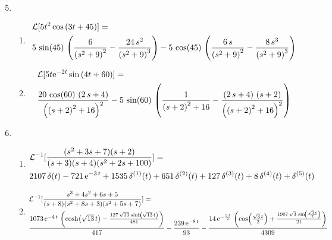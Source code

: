 \documentclass[main.tex]{subfiles}
\begin{document}
\begin{enumerate}
	\setcounter{enumi}{4}
	\item
		\begin{enumerate}
			\item
				\begin{align*}
					  &\mathcal{L}[5t^2\cos{(3t+45)}] =
					\\& 5\, \sin\!\left(45\right)\, \left(\frac{6}{{\left(s^2 + 9\right)}^2} - \frac{24\, s^2}{{\left(s^2 + 9\right)}^3}\right) - 5\, \cos\!\left(45\right)\, \left(\frac{6\, s}{{\left(s^2 + 9\right)}^2} - \frac{8\, s^3}{{\left(s^2 + 9\right)}^3}\right)
				\end{align*}
			\item
				\begin{align*}
					  &\mathcal{L}[5t\mathrm{e}^{-2t}\sin{(4t+60)}] =
					\\& \frac{20\, \cos\!\left(60\right)\, \left(2\, s + 4\right)}{{\left({\left(s + 2\right)}^2 + 16\right)}^2} - 5\, \sin\!\left(60\right)\, \left(\frac{1}{{\left(s + 2\right)}^2 + 16} - \frac{\left(2\, s + 4\right)\, \left(s + 2\right)}{{\left({\left(s + 2\right)}^2 + 16\right)}^2}\right)
				\end{align*}
		\end{enumerate}

	\item
		\begin{enumerate}
			\item
				\begin{align*}
					  & \mathcal{L}^{-1}[\frac{(s^2+3s+7)(s+2)}{(s+3)(s+4)(s^2+2s+100)}] =
					\\& 2107\, \delta\!\left(t\right) - 721\, \mathrm{e}^{- 3\, t} + 1535\, \delta^{(1)}\!\left(t\right) + 651\, \delta^{(2)}\!\left(t\right) + 127\, \delta^{(3)}\!\left(t\right) + 8\, \delta^{(4)}\!\left(t\right) + \delta^{(5)}\!\left(t\right)
				\end{align*}
			\item
				\begin{align*}
					  & \mathcal{L}^{-1}[\frac{s^3+4s^2+6s+5}{(s+8)(s^2+8s+3)(s^2+5s+7)}] = 
					\\& \frac{1073\, \mathrm{e}^{- 4\, t}\, \left(\cosh\!\left(\sqrt{13}\, t\right) - \frac{127\, \sqrt{13}\, \sinh\!\left(\sqrt{13}\, t\right)}{481}\right)}{417} - \frac{239\, \mathrm{e}^{- 8\, t}}{93} - \frac{14\, \mathrm{e}^{-\frac{5\, t}{2}}\, \left(\cos\!\left(\frac{\sqrt{3}\, t}{2}\right) + \frac{1907\, \sqrt{3}\, \sin\!\left(\frac{\sqrt{3}\, t}{2}\right)}{21}\right)}{4309}
				\end{align*}
		\end{enumerate}

\end{enumerate}
\end{document}
